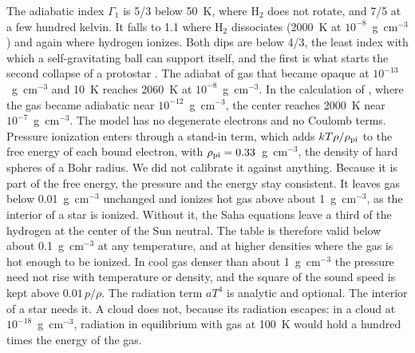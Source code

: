 \documentclass[twocolumn]{aastex701}
\begin{document}
The adiabatic index $\Gamma_1$ is 5/3 below 50~K, where H$_2$ does not rotate, and 7/5 at a few hundred kelvin. It falls to 1.1 where H$_2$ dissociates (2000~K at $10^{-8}$~g~cm$^{-3}$) and again where hydrogen ionizes. Both dips are below 4/3, the least index with which a self-gravitating ball can support itself, and the first is what starts the second collapse of a protostar \citep{Larson1969}. The adiabat of gas that became opaque at $10^{-13}$~g~cm$^{-3}$ and 10~K reaches 2060~K at $10^{-8}$~g~cm$^{-3}$. In the calculation of \citet{Masunaga2000}, where the gas became adiabatic near $10^{-12}$~g~cm$^{-3}$, the center reaches 2000~K near $10^{-7}$~g~cm$^{-3}$. The model has no degenerate electrons and no Coulomb terms. Pressure ionization enters through a stand-in term, which adds $kT\rho/\rho_{\rm pi}$ to the free energy of each bound electron, with $\rho_{\rm pi} = 0.33$~g~cm$^{-3}$, the density of hard spheres of a Bohr radius. We did not calibrate it against anything. Because it is part of the free energy, the pressure and the energy stay consistent. It leaves gas below 0.01~g~cm$^{-3}$ unchanged and ionizes hot gas above about 1~g~cm$^{-3}$, as the interior of a star is ionized. Without it, the Saha equations leave a third of the hydrogen at the center of the Sun neutral. The table is therefore valid below about 0.1~g~cm$^{-3}$ at any temperature, and at higher densities where the gas is hot enough to be ionized. In cool gas denser than about 1~g~cm$^{-3}$ the pressure need not rise with temperature or density, and the square of the sound speed is kept above $0.01\,p/\rho$. The radiation term $aT^4$ is analytic and optional. The interior of a star needs it. A cloud does not, because its radiation escapes: in a cloud at $10^{-18}$~g~cm$^{-3}$, radiation in equilibrium with gas at 100~K would hold a hundred times the energy of the gas.
\end{document}
